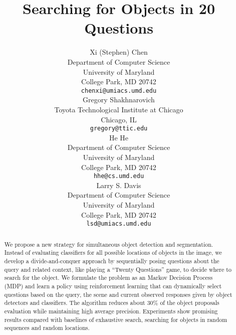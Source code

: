 \documentclass{article} %
\title{Searching for Objects in 20 Questions}
\author{
Xi (Stephen) Chen\\
Department of Computer Science\\
University of Maryland\\
College Park, MD 20742 \\
\texttt{chenxi@umiacs.umd.edu} \\
\And
Gregory Shakhnarovich\\
Toyota Technological Institute at Chicago \\
Chicago, IL\\
\texttt{gregory@ttic.edu} \\
\AND
He He \\
Department of Computer Science\\
University of Maryland\\
College Park, MD 20742 \\
\texttt{hhe@cs.umd.edu} \\
\And
Larry S. Davis \\
Department of Computer Science\\
University of Maryland\\
College Park, MD 20742 \\
\texttt{lsd@umiacs.umd.edu} 
}
\begin{document}
\maketitle

\begin{abstract}
We propose a new strategy for simultaneous object detection and segmentation. Instead of evaluating classifiers for all possible locations of objects in the
image, we develop a divide-and-conquer approach by sequentially posing questions about the query and related context, like playing a “Twenty Questions” game, to decide where to search for the object. We formulate the problem as an Markov Decision Process (MDP) and learn a policy using reinforcement learning that can dynamically select questions based on the query, the scene and current observed responses given by object detectors and classifiers. The algorithm reduces about 30\% of the object proposals evaluation while maintaining high average precision. Experiments show promising results compared with baselines of exhaustive search, searching for objects in random sequences and random locations.
\end{abstract}



% 

% 
% 






{\small


}
\end{document}
